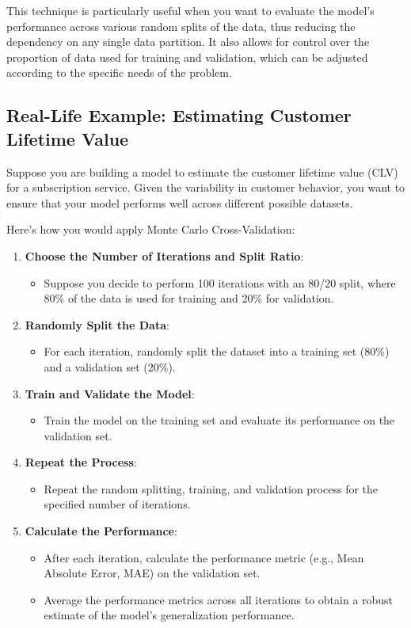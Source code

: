\documentclass[10pt]{article}
\begin{document}
This technique is particularly useful when you want to evaluate the model's performance across various random splits of the data, thus reducing the dependency on any single data partition. It also allows for control over the proportion of data used for training and validation, which can be adjusted according to the specific needs of the problem.

\subsection{Real-Life Example: Estimating Customer Lifetime Value}
Suppose you are building a model to estimate the customer lifetime value (CLV) for a subscription service. Given the variability in customer behavior, you want to ensure that your model performs well across different possible datasets.

Here’s how you would apply Monte Carlo Cross-Validation:

\begin{enumerate}
    \item \textbf{Choose the Number of Iterations and Split Ratio}:
    \begin{itemize}
        \item Suppose you decide to perform 100 iterations with an 80/20 split, where 80\% of the data is used for training and 20\% for validation.
    \end{itemize}
    \item \textbf{Randomly Split the Data}:
    \begin{itemize}
        \item For each iteration, randomly split the dataset into a training set (80\%) and a validation set (20\%).
    \end{itemize}
    \item \textbf{Train and Validate the Model}:
    \begin{itemize}
        \item Train the model on the training set and evaluate its performance on the validation set.
    \end{itemize}
    \item \textbf{Repeat the Process}:
    \begin{itemize}
        \item Repeat the random splitting, training, and validation process for the specified number of iterations.
    \end{itemize}
    \item \textbf{Calculate the Performance}:
    \begin{itemize}
        \item After each iteration, calculate the performance metric (e.g., Mean Absolute Error, MAE) on the validation set.
        \item Average the performance metrics across all iterations to obtain a robust estimate of the model's generalization performance.
    \end{itemize}
\end{enumerate}
\end{document}
